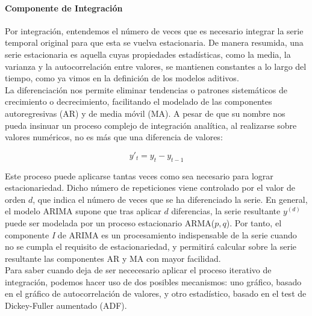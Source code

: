 \paragraph{Componente de Integración}
\mbox{}

Por integración, entendemos el número de veces que es necesario integrar la serie temporal original para que esta se vuelva estacionaria.  De manera resumida, una serie estacionaria es aquella cuyas propiedades estadísticas, como la media, la varianza y la autocorrelación entre valores, se mantienen constantes a lo largo del tiempo,  como ya vimos en la definición de los modelos aditivos.\\

La diferenciación nos permite eliminar tendencias o patrones sistemáticos de crecimiento o decrecimiento, facilitando el modelado de las componentes autoregresivas (AR) y de media móvil (MA). A pesar de que su nombre nos pueda insinuar un proceso complejo de integración analítica, al realizarse sobre valores numéricos, no es más que una diferencia de valores:

\[
y'_t = y_t - y_{t-1}
\]

Este proceso puede aplicarse tantas veces como sea necesario para lograr estacionariedad. Dicho número de repeticiones viene controlado por el valor de orden \( d \), que indica el número de veces que se ha diferenciado la serie. En general, el modelo ARIMA supone que tras aplicar \( d \) diferencias, la serie resultante \( y^{(d)} \) puede ser modelada por un proceso estacionario ARMA(\(p,q\)). Por tanto, el componente \textit{I} de ARIMA es un procesamiento indispensable de la serie cuando no se cumpla el requisito de estacionariedad, y permitirá calcular sobre la serie resultante las componentes AR y MA con mayor facilidad. \\

Para saber cuando deja de ser nececesario aplicar el proceso iterativo de integración, podemos hacer uso de dos posibles mecanismos: uno gráfico, basado en el gráfico de autocorrelación de valores, y otro estadístico, basado en el test de Dickey-Fuller aumentado (ADF).

